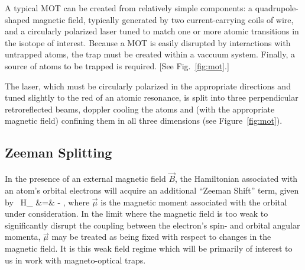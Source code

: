A typical MOT can be created from relatively simple components:  a quadrupole-shaped magnetic field, typically generated by two current-carrying coils of wire, and a circularly polarized laser tuned to match one or more atomic transitions in the isotope of interest.  Because a MOT is easily disrupted by interactions with untrapped atoms, the trap must be created within a vaccuum system.  Finally, a source of atoms to be trapped is required.  [See Fig.~\ref{fig:mot}.]

The laser, which must be circularly polarized in the appropriate directions and tuned slightly to the red of an atomic resonance, is split into three perpendicular retroreflected beams, doppler cooling the atoms and (with the appropriate magnetic field) confining them in all three dimensions (see Figure~\ref{fig:mot}).  





\subsection{Zeeman Splitting}
In the presence of an external magnetic field $\vec{B}$, the Hamiltonian associated with an atom's orbital electrons will acquire an additional ``Zeeman Shift'' term, given by~\cite{corney}
\bea
\label{zeeman_hamiltonian}
H_{} &=& - \vec{\mu}\cdot {},
\eea
where $\vec{\mu}$ is the magnetic moment associated with the orbital under consideration.  In the limit where the magnetic field is too weak to significantly disrupt the coupling between the electron's spin- and orbital angular momenta, $\vec{\mu}$ may be treated as being fixed with respect to changes in the magnetic field.  It is this weak field regime which will be primarily of interest to us in work with magneto-optical traps.


